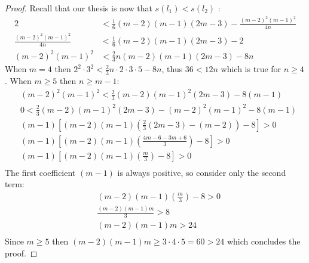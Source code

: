 \begin{proof}
	Recall that our thesis is now that $s(l_1)<s(l_2)$ :
	\begin{align*}
		2 &< \frac{1}{6}(m-2)(m-1)(2m-3)-\frac{(m-2)^2(m-1)^2}{4n}\\
		\frac{(m-2)^2(m-1)^2}{4n} &< \frac{1}{6}(m-2)(m-1)(2m-3)-2 \\
		(m-2)^2(m-1)^2 &< \frac{2}{3}n(m-2)(m-1)(2m-3)-8n
	\end{align*} 
	When $m=4$ then $2^2 \cdot 3^2 < \frac{2}{3}n\cdot2 \cdot3\cdot5-8n$, thus $36<12n$ which is true for $n\geq4$.
	When $m\geq5$ then $n\geq m-1$:
	\begin{align*}
		&(m-2)^2(m-1)^2 < \frac{2}{3}(m-2)(m-1)^2(2m-3)-8(m-1)\\
		&0 < \frac{2}{3}(m-2)(m-1)^2(2m-3)-(m-2)^2(m-1)^2-8(m-1)\\
		&(m-1)[(m-2)(m-1)\left(\frac{2}{3}(2m-3)-(m-2)\right)-8]>0\\
		&(m-1)[(m-2)(m-1)\left(\frac{4m-6-3m+6}{3}\right)-8]>0\\
		&(m-1)[(m-2)(m-1)\left(\frac{m}{3}\right)-8]>0\\
	\end{align*}
	The first coefficient $(m-1)$ is always positive, so consider only the second term:
	\begin{align*}
		&(m-2)(m-1)\left(\frac{m}{3}\right)-8>0\\
		&\frac{(m-2)(m-1)m}{3}>8\\
		&(m-2)(m-1)m>24\\
	\end{align*}
	Since $m\geq5$ then $(m-2)(m-1)m\geq 3\cdot4\cdot5=60>24$ which concludes the proof.
\end{proof}

